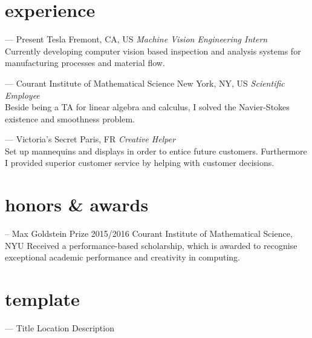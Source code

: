 \documentclass[a4paper]{simpleCV}
\begin{document}

\section{experience}

\entry
{ --- Present}
{Tesla}
{Fremont, CA, US}
{\emph{Machine Vision Engineering Intern}\\
Currently developing computer vision based inspection and analysis systems for manufacturing
processes and material flow.}

\entry
{ --- }
{Courant Institute of Mathematical Science}
{New York, NY, US}
{\emph{Scientific Employee}\\
Beside being a TA for linear algebra and calculus, I solved the Navier-Stokes existence
and smoothness problem.}

\entry
{ --- }
{Victoria's Secret}
{Paris, FR}
{\emph{Creative Helper}\\
Set up mannequins and displays in order to entice future customers. Furthermore I provided
superior customer service by helping with customer decisions.}


\section{honors \& awards}

\entry
{--}
{Max Goldstein Prize 2015/2016}
{Courant Institute of Mathematical Science, NYU}
{Received a performance-based scholarship, which is awarded to recognise exceptional academic
performance and creativity in computing.}

\section{template}

\entry
{ --- }
{Title}
{Location}
{Description}
\end{document}
